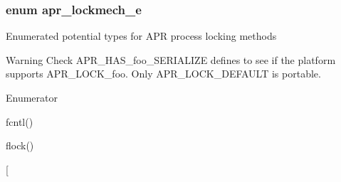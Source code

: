 \subsubsection[{\texorpdfstring{apr\+\_\+lockmech\+\_\+e}{apr_lockmech_e}}]{\setlength{\rightskip}{0pt plus 5cm}enum {\bf apr\+\_\+lockmech\+\_\+e}}\hypertarget{group__apr__proc__mutex_ga75dd95a48a1e855a87b509b522746ed4}{}\label{group__apr__proc__mutex_ga75dd95a48a1e855a87b509b522746ed4}
Enumerated potential types for A\+PR process locking methods \begin{DoxyWarning}{Warning}
Check A\+P\+R\+\_\+\+H\+A\+S\+\_\+foo\+\_\+\+S\+E\+R\+I\+A\+L\+I\+ZE defines to see if the platform supports A\+P\+R\+\_\+\+L\+O\+C\+K\+\_\+foo. Only A\+P\+R\+\_\+\+L\+O\+C\+K\+\_\+\+D\+E\+F\+A\+U\+LT is portable. 
\end{DoxyWarning}
\begin{Desc}
\item[Enumerator]\par
\begin{description}
\item[{\em 
A\+P\+R\+\_\+\+L\+O\+C\+K\+\_\+\+F\+C\+N\+TL\hypertarget{group__apr__proc__mutex_gga75dd95a48a1e855a87b509b522746ed4ad9dad69d83d1e112054ad21a7e4e16b3}{}\label{group__apr__proc__mutex_gga75dd95a48a1e855a87b509b522746ed4ad9dad69d83d1e112054ad21a7e4e16b3}
}]fcntl() \item[{\em 
A\+P\+R\+\_\+\+L\+O\+C\+K\+\_\+\+F\+L\+O\+CK\hypertarget{group__apr__proc__mutex_gga75dd95a48a1e855a87b509b522746ed4a1d06f73a37dae31233299401c9594b41}{}\label{group__apr__proc__mutex_gga75dd95a48a1e855a87b509b522746ed4a1d06f73a37dae31233299401c9594b41}
}]flock() \item[{\em 
}
\end{description}
\end{Desc}
